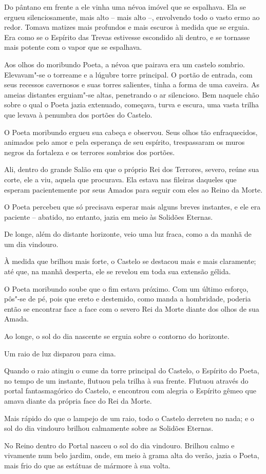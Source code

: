 Do pântano em frente a ele vinha uma névoa imóvel que se espalhava. Ela se
ergueu silenciosamente, mais alto -- mais alto --, envolvendo todo o
vasto ermo ao redor. Tomava matizes mais profundos e mais escuros à
medida que se erguia. Era como se o Espírito das Trevas estivesse
escondido ali dentro, e se tornasse mais potente com o vapor que se
espalhava.

Aos olhos do moribundo Poeta, a névoa que pairava era um castelo
sombrio. Elevavam"-se o torreame e a lúgubre torre principal. O portão de
entrada, com seus recessos cavernosos e suas torres salientes, tinha a
forma de uma caveira. As ameias distantes erguiam"-se altas, penetrando o
ar silencioso. Bem naquele chão sobre o qual o Poeta jazia extenuado,
começava, turva e escura, uma vasta trilha que levava à penumbra dos
portões do Castelo.

O Poeta moribundo ergueu sua cabeça e observou. Seus olhos tão
enfraquecidos, animados pelo amor e pela esperança de seu espírito,
trespassaram os muros negros da fortaleza e os terrores sombrios dos
portões.



Ali, dentro do grande Salão em que o próprio Rei dos Terrores, severo,
reúne sua corte, ele a viu, aquela que procurava. Ela estava nas
fileiras daqueles que esperam pacientemente por seus Amados para seguir
com eles ao Reino da Morte.

O Poeta percebeu que só precisava esperar mais alguns breves instantes,
e ele era paciente -- abatido, no entanto, jazia em meio às Solidões
Eternas.

De longe, além do distante horizonte, veio uma luz fraca, como a da
manhã de um dia vindouro.

À medida que brilhou mais forte, o Castelo se destacou mais e mais
claramente; até que, na manhã desperta, ele se revelou em toda sua
extensão gélida.

O Poeta moribundo soube que o fim estava próximo. Com um último esforço,
pôs"-se de pé, pois que ereto e destemido, como manda a hombridade,
poderia então se encontrar face a face com o severo Rei da Morte diante
dos olhos de sua Amada.

Ao longe, o sol do dia nascente se erguia sobre o contorno do horizonte.

Um raio de luz disparou para cima.

Quando o raio atingiu o cume da torre principal do Castelo, o Espírito
do Poeta, no tempo de um instante, flutuou pela trilha à sua frente.
Flutuou através do portal fantasmagórico do Castelo, e encontrou com
alegria o Espírito gêmeo que amava diante da própria face do Rei da
Morte.

Mais rápido do que o lampejo de um raio, todo o Castelo derreteu no
nada; e o sol do dia vindouro brilhou calmamente sobre as Solidões
Eternas.

No Reino dentro do Portal nasceu o sol do dia vindouro. Brilhou calmo e
vivamente num belo jardim, onde, em meio à grama alta do verão, jazia o
Poeta, mais frio do que as estátuas de mármore à sua volta.
